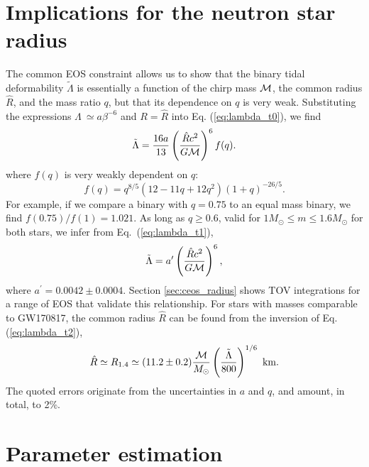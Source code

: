 \section{Implications for the neutron star radius}

The common EOS constraint allows us to show that the binary tidal deformability $\tilde\Lambda$ is essentially a function of the chirp mass ${\cal{M}}$, the common radius $\hat R$, and the mass ratio $q$, but that its dependence on $q$ is very weak. Substituting the expressions $\Lambda~\simeq a\beta^{-6}$ and $R=\hat R$ into Eq. (\ref{eq:lambda_t0}), we find
\begin{equation}
\tilde{\Lambda}=
\frac{16a}{13}
\left(
\frac{\hat{R}c^2}{G{\cal M}}
\right)^6 f(q).
\label{eq:lambda_t1}\end{equation}
where $f(q)$ is very weakly dependent on $q$:
\begin{equation}
f(q)=q^{8/5}(12-11q+12q^2)(1+q)^{-26/5}.
\end{equation}
For example, if we compare a binary with $q = 0.75$ to an equal mass binary, we find $f(0.75)/f(1)=1.021$. As long as $q\ge0.6$, valid for $1M_\odot\le m\le 1.6 M_\odot$ for both stars, we infer from Eq.~(\ref{eq:lambda_t1}),
\begin{equation}
\tilde{\Lambda}=a^\prime\left(\frac{\hat{R}c^2}{G{\cal M}}\right)^6,
\label{eq:lambda_t2}\end{equation}
where $a^\prime=0.0042\pm0.0004$. Section \ref{sec:ceos_radius} shows TOV integrations for a range of EOS that validate this relationship. For stars with masses comparable to GW170817, the common radius $\hat R$ can be found from the inversion of Eq. (\ref{eq:lambda_t2}),
\begin{equation}
\hat R\simeq R_{1.4}\simeq (11.2\pm0.2)\frac{\cal M}{M_\odot}\left(\frac{\tilde{\Lambda}}{800}\right)^{1/6}{\rm~km}.
\label{eq:rhat}\end{equation}
The quoted errors originate from the uncertainties in $a$ and $q$, and amount, in total, to 2\%.

\section{Parameter estimation}
